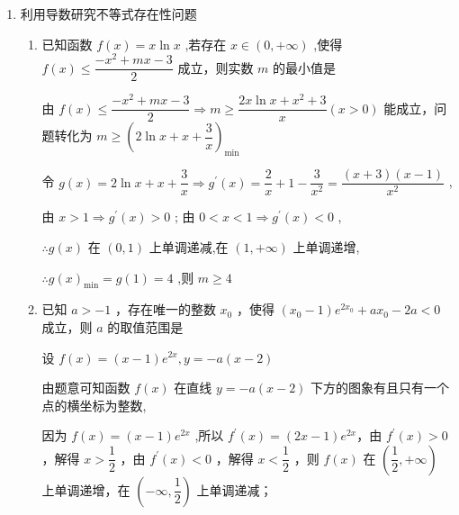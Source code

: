 \begin{enumerate}
    \item 利用导数研究不等式存在性问题
    \begin{enumerate}
        \item 已知函数 $f\left( x\right)  = x\ln x$ ,若存在 $x \in  \left( {0, + \infty }\right)$ ,使得 $f\left( x\right)  \leq  \dfrac{-{x}^{2} + {mx} - 3}{2}$ 成立，则实数 $m$ 的最小值是
        \begin{jieda}
            由 $f\left( x\right)  \leq  \dfrac{-{x}^{2} + {mx} - 3}{2} \Longrightarrow  m \geq  \dfrac{{2x}\ln x + {x}^{2} + 3}{x}\left( {x > 0}\right)$ 能成立，问题转化为 $m \geq  {\left( 2\ln x + x + \dfrac{3}{x}\right) }_{\min }$
            
            令 $g\left( x\right)  = 2\ln x + x + \dfrac{3}{x} \Longrightarrow  {g}^{\prime }\left( x\right)  = \dfrac{2}{x} + 1 - \dfrac{3}{{x}^{2}} = \dfrac{\left( {x + 3}\right) \left( {x - 1}\right) }{{x}^{2}}$ ,
            
            由 $x > 1 \Longrightarrow  {g}^{\prime }\left( x\right)  > 0$ ; 由 $0 < x < 1 \Longrightarrow  {g}^{\prime }\left( x\right)  < 0$ ,
            
            $\therefore g\left( x\right)$ 在 $\left( {0,1}\right)$ 上单调递减,在 $\left( {1, + \infty }\right)$ 上单调递增,
            
            $\therefore g{\left( x\right) }_{\min } = g\left( 1\right)  = 4$ ,则 $m \geq  4$ 
        \end{jieda}
        
        \item 已知 $a >  - 1$ ，存在唯一的整数 ${x}_{0}$ ，使得 $\left( {{x}_{0} - 1}\right) {{e}}^{2{x}_{0}} + a{x}_{0} - {2a} < 0$ 成立，则 $a$ 的取值范围是

        \begin{jieda}
            设 $f\left( x\right)  = \left( {x - 1}\right) {{e}}^{2x},y =  - a\left( {x - 2}\right)$
            
            由题意可知函数 $f\left( x\right)$ 在直线 $y =  - a\left( {x - 2}\right)$ 下方的图象有且只有一个点的横坐标为整数,
            
            因为 $f\left( x\right)  = \left( {x - 1}\right) {{e}}^{2x}$ ,所以 ${f}^{\prime }\left( x\right)  = \left( {{2x} - 1}\right) {{e}}^{2x}$，由 ${f}^{\prime }\left( x\right)  > 0$ ，解得 $x > \dfrac{1}{2}$ ，由 ${f}^{\prime }\left( x\right)  < 0$ ，解得 $x < \dfrac{1}{2}$ ，则 $f\left( x\right)$ 在 $\left( {\dfrac{1}{2}, + \infty }\right)$ 上单调递增，在 $\left( {-\infty ,\dfrac{1}{2}}\right)$ 上单调递减；
            

\end{jieda}
\end{enumerate}
\end{enumerate}
